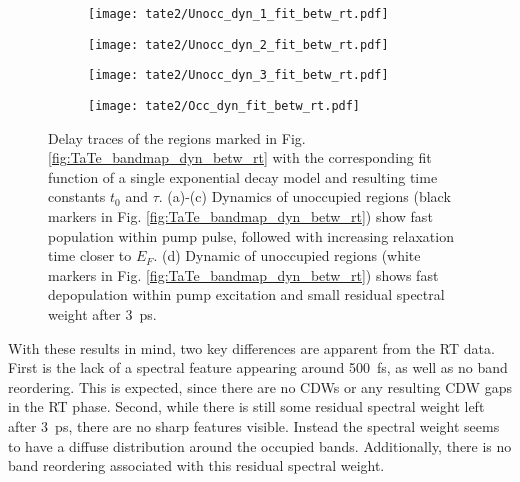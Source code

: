 \begin{figure}[b!]
	\centering
	\begin{subfigure}[b]{0.24\textwidth}
		\texttt{[image: tate2/Unocc\_dyn\_1\_fit\_betw\_rt.pdf]}
		\caption{}
	\end{subfigure}
	\begin{subfigure}[b]{0.24\textwidth}
		\texttt{[image: tate2/Unocc\_dyn\_2\_fit\_betw\_rt.pdf]}
		\caption{}
	\end{subfigure}
	\begin{subfigure}[b]{0.24\textwidth}
		\texttt{[image: tate2/Unocc\_dyn\_3\_fit\_betw\_rt.pdf]}
		\caption{}
	\end{subfigure}
	\begin{subfigure}[b]{0.24\textwidth}
		\texttt{[image: tate2/Occ\_dyn\_fit\_betw\_rt.pdf]}
		\caption{}
	\end{subfigure}
	\caption{
		Delay traces of the regions marked in Fig. \ref{fig:TaTe_bandmap_dyn_betw_rt} with the corresponding fit function of a single exponential decay model and resulting time constants $t_0$ and $\tau$. (a)-(c) Dynamics of unoccupied regions (black markers in Fig. \ref{fig:TaTe_bandmap_dyn_betw_rt}) show fast population within pump pulse, followed with increasing relaxation time closer to $E_F$. (d) Dynamic of unoccupied regions (white markers in Fig. \ref{fig:TaTe_bandmap_dyn_betw_rt}) shows fast depopulation within pump excitation and small residual spectral weight after \qty{3}{\pico\second}.}
	\label{fig:TaTe_dyn_betw_rt}
\end{figure}

With these results in mind, two key differences are apparent from the RT data.
First is the lack of a spectral feature appearing around \qty{500}{\femto\second}, as well as no band reordering.
This is expected, since there are no CDWs or any resulting CDW gaps in the RT phase.
Second, while there is still some residual spectral weight left after \qty{3}{\pico\second}, there are no sharp features visible.
Instead the spectral weight seems to have a diffuse distribution around the occupied bands.
Additionally, there is no band reordering associated with this residual spectral weight.



